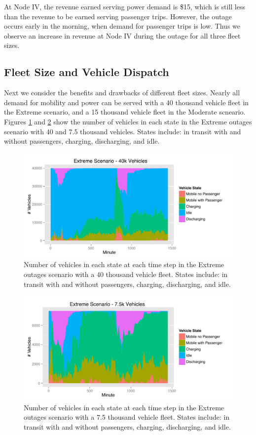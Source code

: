 \documentclass[journal]{IEEEtran}
\begin{document}
At Node IV, the revenue earned serving power demand is \$15, which is still less than the revenue to be earned serving passenger trips. However, the outage occurs early in the morning, when demand for passenger trips is low. Thus we observe an increase in revenue at Node IV during the outage for all three fleet sizes.

\subsection{Fleet Size and Vehicle Dispatch}
Next we consider the benefits and drawbacks of different fleet sizes. Nearly all demand for mobility and power can be served with a 40 thousand vehicle fleet in the Extreme scenario, and a 15 thousand vehicle fleet in the Moderate scneario. Figures \ref{fig:time_extreme_40k} and \ref{fig:time_extreme_7500} show the number of vehicles in each state in the Extreme outages scenario with 40 and 7.5 thousand vehicles. States include: in transit with and without passengers, charging, discharging, and idle. 

\begin{figure}[!htbp]
  \includegraphics[width=\linewidth]{plots/states-area-40k.pdf}
  \caption{Number of vehicles in each state at each time step in the Extreme outages scenario with a 40 thousand vehicle fleet. States include: in transit with and without passengers, charging, discharging, and idle.}
  \label{fig:time_extreme_40k}
\end{figure}

\begin{figure}[!htbp]
  \includegraphics[width=\linewidth]{plots/states-area-7500.pdf}
  \caption{Number of vehicles in each state at each time step in the Extreme outages scenario with a 7.5 thousand vehicle fleet. States include: in transit with and without passengers, charging, discharging, and idle.}
  \label{fig:time_extreme_7500}
\end{figure}
\end{document}
